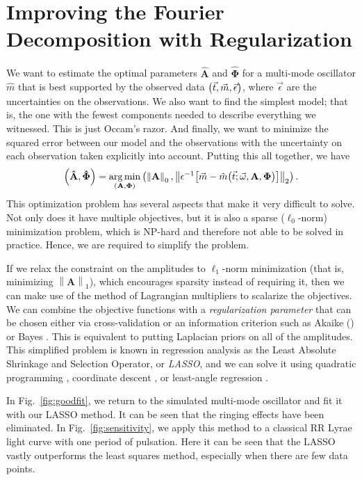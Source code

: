 \documentclass[11pt,twoside]{book}
\begin{document}
\section{Improving the Fourier Decomposition with Regularization}
We want to estimate the optimal parameters $\mathbf {\hat A}$ and $\boldsymbol{\hat \Phi}$ for a multi-mode oscillator $\hat m$ that is best supported by the observed data $\qty(\vec t, \vec m, \vec \epsilon)$, where $\vec \epsilon$ are the uncertainties on the observations. We also want to find the simplest model; that is, the one with the fewest components needed to describe everything we witnessed. This is just Occam's razor. And finally, we want to minimize the squared error between our model and the observations with the uncertainty on each observation taken explicitly into account. Putting this all together, we have
\begin{equation}
    \qty(\mathbf {\hat A}, \boldsymbol{\hat \Phi}) =
      \underset{\qty(\mathbf A, \boldsymbol \Phi)}{\arg\min} 
      \left(\left\|\mathbf{A} \right\|_0,
            \left\| \epsilon^{-1}\qty[\vec m - \hat m\qty(\vec t ; {\vec \omega}, \mathbf{A}, \boldsymbol{\Phi})]\right\|_2
      \right). 
\end{equation}
This optimization problem has several aspects that make it very difficult to solve. Not only does it have multiple objectives, but it is also a sparse ($\ell_0$-norm) minimization problem, which is NP-hard \citep{natarajan1995sparse} and therefore not able to be solved in practice. Hence, we are required to simplify the problem. 

If we relax the constraint on the amplitudes to $\ell_1$-norm minimization (that is, minimizing $\left\|\mathbf{A} \right\|_1$), which encourages sparsity instead of requiring it, then we can make use of the method of Lagrangian multipliers to scalarize the objectives. We can combine the objective functions with a \emph{regularization parameter} that can be chosen either via cross-validation or an information criterion such as Akaike (\citeyear{akaike1974new}) or Bayes \citep{schwarz1978estimating}. This is equivalent to putting Laplacian priors on all of the amplitudes. This simplified problem is known in regression analysis as the Least Absolute Shrinkage and Selection Operator, or \emph{LASSO}, and we can solve it using quadratic programming \citep{tibshirani1996regression}, coordinate descent \citep{fu1998penalized}, or least-angle regression \citep{efron2004least}. 

In Fig.~\ref{fig:goodfit}, we return to the simulated multi-mode oscillator and fit it with our LASSO method. It can be seen that the ringing effects have been eliminated. In Fig.~\ref{fig:sensitivity}, we apply this method to a classical RR Lyrae light curve with one period of pulsation. Here it can be seen that the LASSO vastly outperforms the least squares method, especially when there are few data points. 
\end{document}
